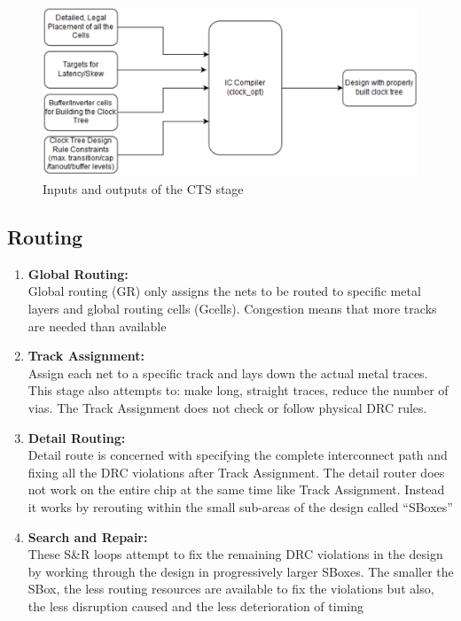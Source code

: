\documentclass[../main.tex]{subfiles}
\begin{document}
\begin{figure}[h]
\centering
\includegraphics[width=15cm]{diagrams/IO_CTS.PNG}
\caption{ Inputs and outputs of the CTS stage}
\label{fig:IO_CTS}
\end{figure}
\subsection{Routing}

\begin{enumerate}
\item \textbf{Global Routing:}\\
Global routing (GR) only assigns the nets to be routed to specific metal layers and global routing cells (Gcells). Congestion means that more tracks are needed than available

\item \textbf{Track Assignment:}\\
Assign each net to a specific track and lays down the actual metal traces. This stage also attempts to: make long, straight traces, reduce the number of vias. The Track Assignment does not check or follow physical DRC rules.

\item \textbf{Detail Routing:}\\
Detail route is concerned with specifying the complete interconnect path and fixing all the DRC violations after Track Assignment. The detail router does not work on the entire chip at the same time like Track Assignment. Instead it works by rerouting within the small sub-areas of the design called “SBoxes”

\item \textbf{Search and Repair:}\\
These S\&R loops attempt to fix the remaining DRC violations in the design by working through the design in progressively larger SBoxes. The smaller the SBox, the less routing resources are available to fix the violations but also, the less disruption caused and the less deterioration of timing
\end{enumerate}
\end{document}
